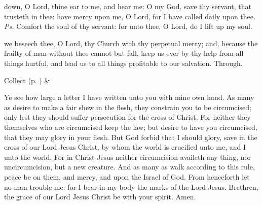 
\introit
{} down, O Lord, thine ear to me, and hear me: O my God, save thy servant, that trusteth in thee: have mercy upon me, O Lord, for I have called daily upon thee. \textit{Ps.} Comfort the soul of thy servant: for unto thee, O Lord, do I lift up my soul.

\collect
{} we beseech thee, O Lord, thy Church with thy perpetual mercy; and, because the frailty of man without thee cannot but fall, keep us ever by thy help from all things hurtful, and lead us to all things profitable to our salvation. Through.
\begin{rubric}
     Collect  (p. \pageref{SPSaints}) \&  
\end{rubric}

 Ye see how large a letter I have written unto you with mine own hand. As many as desire to make a fair shew in the flesh, they constrain you to be circumcised; only lest they should suffer persecution for the cross of Christ. For neither they themselves who are circumcised keep the law; but desire to have you circumcised, that they may glory in your flesh. But God forbid that I should glory, save in the cross of our Lord Jesus Christ, by whom the world is crucified unto me, and I unto the world. For in Christ Jesus neither circumcision availeth any thing, nor uncircumcision, but a new creature. And as many as walk according to this rule, peace be on them, and mercy, and upon the Israel of God. From henceforth let no man trouble me: for I bear in my body the marks of the Lord Jesus. Brethren, the grace of our Lord Jesus Christ be with your spirit. Amen.


